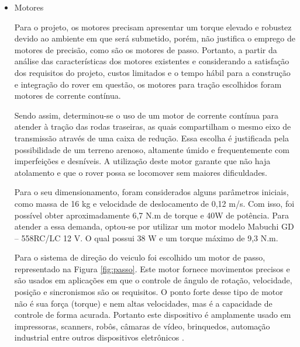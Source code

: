   \begin{itemize}
    \item Motores


 Para o projeto, os motores precisam apresentar um torque elevado e robustez devido ao ambiente em que será submetido, porém, não justifica o emprego de motores de precisão, como são os motores de passo. Portanto, a partir da análise das características dos motores existentes e considerando a satisfação dos requisitos do projeto, custos limitados e o tempo hábil para a construção e integração do rover em questão, os motores para tração escolhidos foram motores de corrente contínua.
 
 Sendo assim, determinou-se o uso de um motor de corrente contínua para atender à tração das rodas traseiras, as quais compartilham o mesmo eixo de transmissão através de uma caixa de redução. Essa escolha é justificada pela possibilidade de um terreno arenoso, altamente úmido e frequentemente com imperfeições e desníveis. A utilização deste motor garante que não haja atolamento e que o rover possa se locomover sem maiores dificuldades.
 
 Para o seu dimensionamento, foram considerados alguns parâmetros iniciais, como massa de 16 kg e velocidade de deslocamento de 0,12 m/s. Com isso, foi possível obter aproximadamente 6,7 N.m de torque e 40W de potência. Para atender a essa demanda, optou-se por utilizar um motor modelo Mabuchi GD – 558RC/LC 12 V. O qual possui 38 W e um torque máximo de 9,3 N.m.
 
 Para o sistema de direção do veiculo foi escolhido um motor de passo, representado na Figura \ref{fig:passo}. Este motor fornece movimentos precisos e são usados em aplicações em que o controle de ângulo de rotação, velocidade, posição e sincronismos são os requisitos. O ponto forte desse tipo de motor não é sua força (torque) e nem altas velocidades, mas é a capacidade de controle de forma acurada.  Portanto este dispositivo é amplamente usado em impressoras, scanners, robôs, câmaras de vídeo, brinquedos, automação industrial entre outros dispositivos eletrônicos \cite{brites}.
      

\end{itemize}
